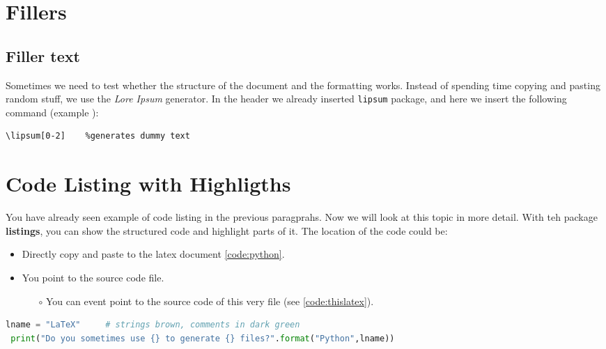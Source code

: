 \documentclass[a4paper,10pt]{report} %
\begin{document}
\section{Fillers}
 \subsection{Filler text}
 Sometimes we need to test whether the structure of the document and the formatting works. Instead of spending time copying and pasting random stuff, we use the \emph{Lore Ipsum} generator.
In the header we already inserted \texttt{lipsum} package, and here we insert the following command (example ):
\begin{lstlisting}[language={[latex]tex}, frame=single,basicstyle=\footnotesize]
  \lipsum[0-2]    %generates dummy text
\end{lstlisting}


\section{Code Listing with Highligths}
You have already seen example of code listing in the previous paragprahs. Now we will look at this topic in more detail.
With teh package \textbf{listings}, you can show the structured code and highlight parts of it. The location of the code could be:
\begin{itemize}
 \item Directly copy and paste to the latex document \ref{code:python}.
 \item You point to the source code file.
 \begin{itemize}
  \item[\(\circ\)] You can event point to the source code of this very file (see \ref{code:thislatex}).
 \end{itemize}
\end{itemize}

\setcounter{lstlisting}{\value{samplecode}}
\begin{lstlisting}[language={python},caption={Copy and paste code (example \alph{samplecode})},label={code:python}, 
     frame=single, captionpos=b, basicstyle=\footnotesize\color{cyan},showstringspaces=false, 
     keywordstyle=\color{magenta}, stringstyle=\color{brown}, commentstyle=\color{ForestGreen} 
     ]
 lname = "LaTeX"     # strings brown, comments in dark green
 print("Do you sometimes use {} to generate {} files?".format("Python",lname))
\end{lstlisting}
\end{document}
